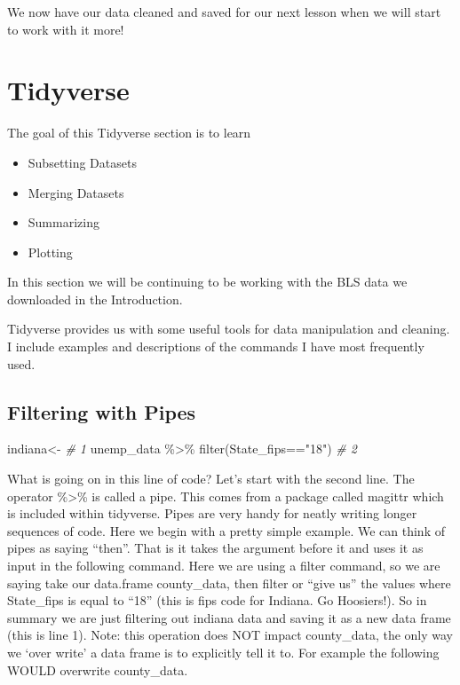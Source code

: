 \documentclass[
]{book}
\newenvironment{Shaded}{\begin{snugshade}}{\end{snugshade}}
\newcommand{\CommentTok}[1]{\textcolor[rgb]{0.56,0.35,0.01}{\textit{#1}}}
\newcommand{\FunctionTok}[1]{\textcolor[rgb]{0.00,0.00,0.00}{#1}}
\newcommand{\NormalTok}[1]{#1}
\newcommand{\OtherTok}[1]{\textcolor[rgb]{0.56,0.35,0.01}{#1}}
\newcommand{\SpecialCharTok}[1]{\textcolor[rgb]{0.00,0.00,0.00}{#1}}
\newcommand{\StringTok}[1]{\textcolor[rgb]{0.31,0.60,0.02}{#1}}
\providecommand{\tightlist}{%
  \setlength{\itemsep}{0pt}\setlength{\parskip}{0pt}}
\begin{document}
We now have our data cleaned and saved for our next lesson when we will start to work with it more!

\hypertarget{tidyverse}{%
\chapter{Tidyverse}\label{tidyverse}}

The goal of this Tidyverse section is to learn

\begin{itemize}
\tightlist
\item
  Subsetting Datasets
\item
  Merging Datasets
\item
  Summarizing
\item
  Plotting
\end{itemize}

In this section we will be continuing to be working with the BLS data we downloaded in the Introduction.

Tidyverse provides us with some useful tools for data manipulation and cleaning. I include examples and descriptions of the commands I have most frequently used.

\hypertarget{filtering-with-pipes}{%
\section{Filtering with Pipes}\label{filtering-with-pipes}}

\begin{Shaded}
\begin{Highlighting}[]
\NormalTok{indiana}\OtherTok{\textless{}{-}}                                    \CommentTok{\# 1}
\NormalTok{    unemp\_data }\SpecialCharTok{\%\textgreater{}\%} \FunctionTok{filter}\NormalTok{(State\_fips}\SpecialCharTok{==}\StringTok{"18"}\NormalTok{)  }\CommentTok{\# 2}
\end{Highlighting}
\end{Shaded}

What is going on in this line of code? Let's start with the second line. The operator \%\textgreater\% is called a pipe. This comes from a package called magittr which is included within tidyverse. Pipes are very handy for neatly writing longer sequences of code. Here we begin with a pretty simple example. We can think of pipes as saying ``then''. That is it takes the argument before it and uses it as input in the following command. Here we are using a filter command, so we are saying take our data.frame county\_data, then filter or ``give us'' the values where State\_fips is equal to ``18'' (this is fips code for Indiana. Go Hoosiers!). So in summary we are just filtering out indiana data and saving it as a new data frame (this is line 1). Note: this operation does NOT impact county\_data, the only way we `over write' a data frame is to explicitly tell it to. For example the following WOULD overwrite county\_data.
\end{document}
